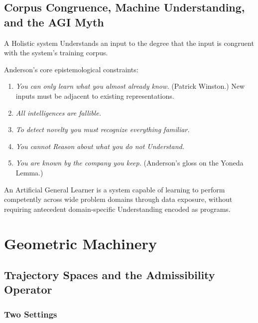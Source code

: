 \documentclass[12pt, a4paper, oneside]{book}
\begin{document}
\chapter{Corpus Congruence, Machine Understanding, and the AGI Myth}
\label{ch:corpus-informal}

\begin{definition}
A Holistic system Understands an input to the degree that the input is
congruent with the system's training corpus.
\end{definition}

Anderson's core epistemological constraints:

\begin{enumerate}
\item \textit{You can only learn what you almost already know.}
  (Patrick Winston.) New inputs must be adjacent to existing representations.
\item \textit{All intelligences are fallible.}
\item \textit{To detect novelty you must recognize everything familiar.}
\item \textit{You cannot Reason about what you do not Understand.}
\item \textit{You are known by the company you keep.}
  (Anderson's gloss on the Yoneda Lemma.)
\end{enumerate}

\begin{definition}
An Artificial General Learner is a system capable of learning to perform
competently across wide problem domains through data exposure, without
requiring antecedent domain-specific Understanding encoded as programs.
\end{definition}

\part{Geometric Machinery}

\chapter{Trajectory Spaces and the Admissibility Operator}
\label{ch:trajspaces}

\section{Two Settings}
\end{document}
